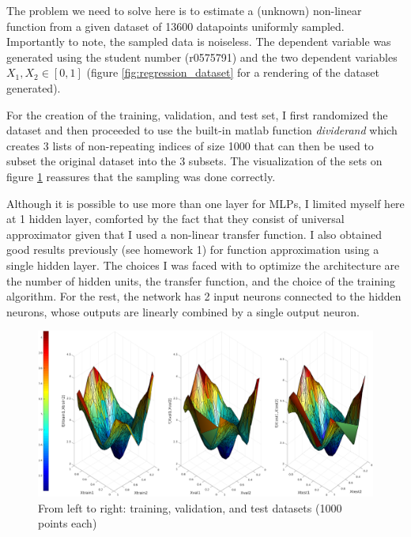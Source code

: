 \documentclass[11pt, a4paper]{article}
\begin{document}

The problem we need to solve here is to estimate a (unknown)
non-linear function from a given dataset of 13600 datapoints uniformly
sampled. Importantly to note, the sampled data is noiseless. The
dependent variable was generated using the student number (r0575791)
and the two dependent variables $X_1, X_2 \in [0, 1]$ (figure
\ref{fig:regression_dataset} for a rendering of the dataset
generated).

For the creation of the training, validation, and test set, I first
randomized the dataset and then proceeded to use the built-in matlab
function \emph{dividerand} which creates 3 lists of non-repeating
indices of size 1000 that can then be used to subset the original
dataset into the 3 subsets. The visualization of the sets on figure
\ref{fig:regression_traindataset} reassures that the sampling was done
correctly.

Although it is possible to use more than one layer for MLPs, I limited
myself here at 1 hidden layer, comforted by the fact that they consist
of universal approximator given that I used a non-linear transfer
function. I also obtained good results previously (see homework 1) for
function approximation using a single hidden layer. The choices I was
faced with to optimize the architecture are the number of hidden
units, the transfer function, and the choice of the training
algorithm. For the rest, the network has 2 input neurons connected to
the hidden neurons, whose outputs are linearly combined by a single
output neuron.

\begin{figure}[H]
  \centering
  \includegraphics[scale=.30]{regression_trainingsets.pdf}
  \caption{From left to right: training, validation, and test datasets
    (1000 points each)}
  \label{fig:regression_traindataset}
\end{figure}
\end{document}
